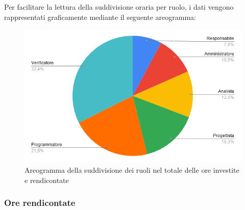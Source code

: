 \documentclass[../piano-di-progetto.tex]{subfiles}
\begin{document}
    Per facilitare la lettura della suddivisione oraria per ruolo, i dati vengono rappresentati graficamente mediante il seguente areogramma:
    \begin{figure}[H]
      \centering
      \includegraphics[width=12cm]{img/ruoli-totale.png}
      \caption{Areogramma della suddivisione dei ruoli nel totale delle ore investite e rendicontate}
      \label{fig:ore-totali}
    \end{figure}


    \subsubsection{Ore rendicontate}
\end{document}
